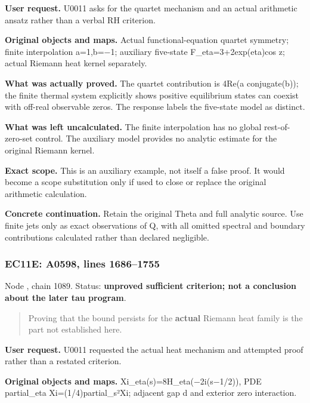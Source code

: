 \documentclass[10pt,a4paper,oneside]{report}
\begin{document}
\textbf{User request.} U0011 asks for the quartet mechanism and an
actual arithmetic ansatz rather than a verbal RH criterion.

\textbf{Original objects and maps.} Actual functional-equation quartet
symmetry; finite interpolation
a=1,b=\allowbreak{}\ensuremath{−}\allowbreak{}1; auxiliary five-state
F\_eta=3+2exp(eta)cos z; actual Riemann heat kernel separately.

\textbf{What was actually proved.} The quartet contribution is 4Re(a
conjugate(b)); the finite thermal system explicitly shows positive
equilibrium states can coexist with off-real observable zeros. The
response labels the five-state model as distinct.

\textbf{What was left uncalculated.} The finite interpolation has no
global rest-of-zero-set control. The auxiliary model provides no
analytic estimate for the original Riemann kernel.

\textbf{Exact scope.} This is an auxiliary example, not itself a false
proof. It would become a scope substitution only if used to close or
replace the original arithmetic calculation.

\textbf{Concrete continuation.} Retain the original Theta and full
analytic source. Use finite jets only as exact observations of Q, with
all omitted spectral and boundary contributions calculated rather than
declared negligible.

\subsubsection{EC11E: A0598, lines
1686--1755}\label{ec11e-a0598-lines-16861755}

Node \protect{}, chain 1089.
Status: \textbf{unproved sufficient criterion; not a conclusion about
the later tau program}.

\begin{quote}
Proving that the bound persists for the \textbf{actual} Riemann heat
family is the part not established here.
\end{quote}

\textbf{User request.} U0011 requested the actual heat mechanism and
attempted proof rather than a restated criterion.

\textbf{Original objects and maps.}
Xi\_eta(s)=8H\_eta(\allowbreak{}\ensuremath{−}\allowbreak{}2i(s\allowbreak{}\ensuremath{−}\allowbreak{}1/2)),
PDE partial\_eta Xi=(1/4)partial\_s²Xi; adjacent gap d and exterior zero
interaction.
\end{document}
